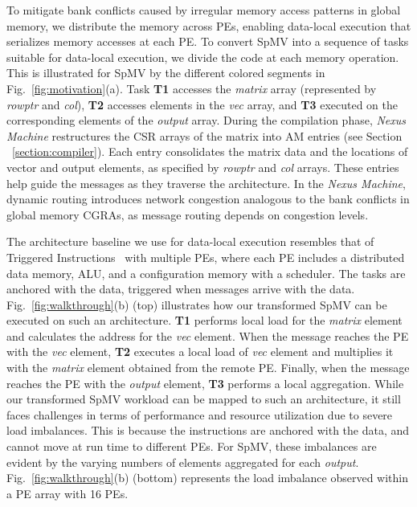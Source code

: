 To mitigate bank conflicts caused by irregular memory access patterns in global memory, we distribute the memory across PEs, enabling data-local execution that serializes memory accesses at each PE. 
To convert SpMV into a sequence of tasks suitable for data-local execution, we divide the code at each memory operation. This is illustrated for SpMV by the different colored segments in Fig.~\ref{fig:motivation}(a).
Task \textbf{T1} accesses the \textit{matrix} array (represented by \textit{rowptr} and \textit{col}), \textbf{T2} accesses elements in the \textit{vec} array, and \textbf{T3} executed on the corresponding elements of the \textit{output} array.
During the compilation phase, \textit{Nexus Machine} restructures the CSR arrays of the matrix into AM entries (see Section ~\ref{section:compiler}). %
Each entry consolidates the matrix data and the locations of vector and output elements, as specified by \textit{rowptr} and \textit{col} arrays. 
These entries help guide the messages as they traverse the architecture.
In the \textit{Nexus Machine}, dynamic routing introduces network congestion analogous to the bank conflicts in global memory CGRAs, as message routing depends on congestion levels. 

The architecture baseline we use for data-local execution resembles that of Triggered Instructions~\cite{tia} with multiple PEs, where each PE includes a distributed data memory, ALU, and a configuration memory with a scheduler. The tasks are anchored with the data, triggered when messages arrive with the data. 
Fig.~\ref{fig:walkthrough}(b) (top) illustrates how our transformed SpMV can be executed on such an architecture.
\textbf{T1} performs local load for the \textit{matrix} element and calculates the address for the \textit{vec} element.
When the message reaches the PE with the \textit{vec} element, \textbf{T2} executes a local load of \textit{vec} element and multiplies it with the \textit{matrix} element obtained from the remote PE.
Finally, when the message reaches the PE with the \textit{output} element, \textbf{T3} performs a local aggregation.
While our transformed SpMV workload can be mapped to such an architecture, it still faces challenges in terms of performance and resource utilization due to severe load imbalances. This is because the instructions are anchored with the data, and cannot move at run time to different PEs.
For SpMV, these imbalances are evident by the varying numbers of elements aggregated for each \textit{output}.
Fig.~\ref{fig:walkthrough}(b) (bottom)  represents the load imbalance observed within a PE array with 16 PEs.

